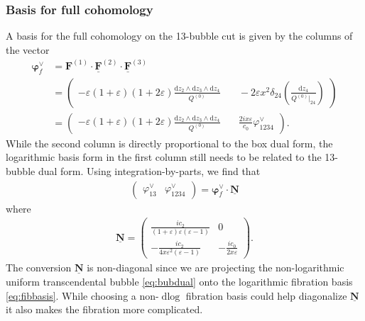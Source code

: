 \documentclass[11pt]{article}
\renewcommand{\d}{\text{d}}
\newcommand{\nn}{\nonumber}
\newcommand{\vphi}{\varphi}
\newcommand{\vep}{\varepsilon}
\newcommand{\bs}[1]{\boldsymbol{#1}}
\newcommand{\mat}[1]{\underline{\boldsymbol{#1}}}
\begin{document}
\subsubsection{Basis for full cohomology}
A basis for the full cohomology on the 13-bubble cut is given by the columns of the vector 
\begin{align} 
	\bs{\vphi}^\vee_f 
	&=\bs{F}^{(1)} \cdot \underline{\bs{F}}^{(2)} \cdot \underline{\bs{F}}^{(3)}
	\nn \\
	&= \begin{pmatrix}
		-\vep(1+\vep)(1+2\vep)		
		\frac{\d z_2 \wedge \d z_3 \wedge \d z_4}{Q^{(0)}}
		&\quad
		-2\vep x^2 \delta_{24}\left(\frac{\d z_4}{Q^{(0)}\vert_{24}}\right)
	\end{pmatrix}
	\nn \\
	&= \begin{pmatrix}
		-\vep(1+\vep)(1+2\vep)	
		\frac{\d z_2 \wedge \d z_3 \wedge \d z_4}{Q^{(0)}}
		&\quad
		\frac{2ix\vep}{c_0} \vphi^\vee_{1234}
	\end{pmatrix}.
	\label{eq:fibbasis}
\end{align}
While the second column is directly proportional to the box dual form, the logarithmic basis form in the first column still needs to be related to the 13-bubble dual form. Using integration-by-parts, we find that 
\begin{align} \label{eq:UTduals}
	\begin{pmatrix}
		\vphi^\vee_{13}
		&
		\vphi^\vee_{1234}
	\end{pmatrix}
	=  \bs{\vphi}^\vee_f \cdot \mat{N}
\end{align}
where
\begin{align}
	\label{eq:N}
	\mat{N} 
	= \begin{pmatrix}
		\frac{ic_2}{(1+\vep)\vep(\vep-1)} 
			& 0 \\
		-\frac{ic_2}{4x\vep^2(\vep-1)} 
			& -\frac{ic_0}{2x\vep} 
	\end{pmatrix}
	.
\end{align}
The conversion $\mat{N}$ is non-diagonal since we are projecting the non-logarithmic uniform transcendental bubble \eqref{eq:bubdual} onto the logarithmic fibration basis \eqref{eq:fibbasis}. While choosing a non-$\d\log$ fibration basis could help diagonalize $\mat{N}$ it also makes the fibration more complicated.
\end{document}
